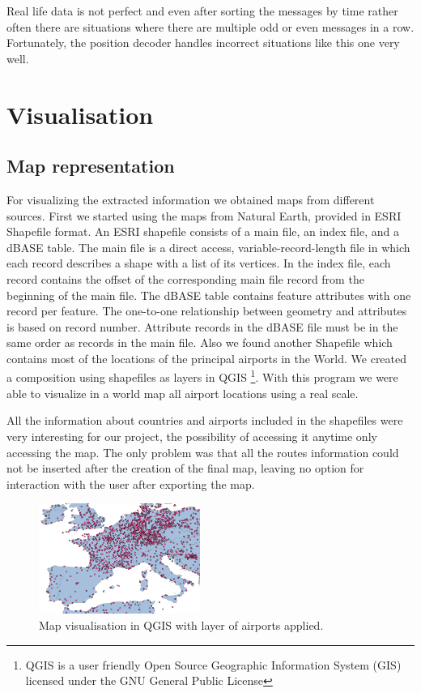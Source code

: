 \documentclass{vldb}
\begin{document}
Real life data is not perfect and even after sorting the messages by time rather often there are 
situations where there are multiple odd or even messages in a row. Fortunately, 
the position decoder handles incorrect situations like this one very well.

\section{Visualisation}

\subsection{Map representation}
For visualizing the extracted information we obtained maps from different sources. 
First we started using the maps from Natural Earth, provided in ESRI Shapefile format.
An ESRI shapefile consists of a main file, an index file, and a dBASE table.  The main
file is a direct access, variable-record-length file in which each record describes a shape
with a list of its vertices.  In the index file, each record contains the offset of the
corresponding main file record from the beginning of the main file.  The dBASE table
contains feature attributes with one record per feature.  The one-to-one relationship
between geometry and attributes is based on record number.  Attribute records in the
dBASE file must be in the same order as records in the main file.
Also we found another Shapefile 
which contains most of the locations of the principal airports in the World. We created a 
composition using shapefiles as layers in QGIS \footnote{QGIS is a user friendly Open Source 
Geographic Information System (GIS) licensed under the GNU General Public License}. 
With this program we were able to visualize in a 
world map all airport locations using a real scale.

All the information about countries and airports included in the shapefiles were very interesting 
for our project, the possibility of accessing it anytime only accessing the map. 
The only problem was that all the routes information could not be inserted after the creation of the 
final map, leaving no option for interaction with the user after exporting the map.

\begin{figure}
\centering
\includegraphics[width=0.47\textwidth]{Europe_mini}
\caption{Map visualisation in QGIS with layer of airports applied.}
\label{fig:Europe_mini}
\end{figure}
\end{document}
